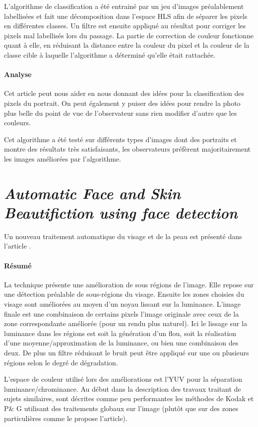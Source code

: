 \documentclass[11pt, french]{report-rd-info}
\begin{document}
L'algorithme de classification a été entrainé par un jeu d'images préalablement labellisées et fait une décomposition dans l'espace HLS afin de séparer les pixels en différentes classes. Un filtre est ensuite appliqué au résultat pour corriger les pixels mal labellisés lors du passage.
La partie de correction de couleur fonctionne quant à elle, en réduisant la distance entre la couleur du pixel et la couleur de la classe cible à laquelle l'algorithme a déterminé qu'elle était rattachée.

\paragraph{Analyse}
Cet article peut nous aider en nous donnant des idées pour la classification des pixels du portrait.
On peut également y puiser des idées pour rendre la photo plus belle du point de vue de l'observateur sans rien modifier d'autre que les couleurs.

Cet algorithme a été testé sur différents types d'images dont des portraits et montre des résultats très satisfaisants, les observateurs préfèrent majoritairement les images améliorées par l'algorithme.

\section{\emph{Automatic Face and Skin Beautifiction using face detection}}
Un nouveau traitement automatique du visage et de la peau est présenté dans l’article \cite{Ciuc2010}.

\paragraph{Résumé}
La technique présente une amélioration de sous régions de l’image.  Elle repose sur une détection préalable de sous-régions du visage. Ensuite les zones choisies du visage sont améliorées au moyen d'un noyau lissant sur la luminance. L'image finale est une combinaison de certains pixels l'image originale avec ceux de la zone correspondante améliorée (pour un rendu plus naturel).
Ici le lissage sur la luminance dans les régions est soit la génération d’un flou, soit la réalisation d’une moyenne/approximation de la luminance, ou bien une combinaison des deux. De plus un filtre réduisant le bruit peut être appliqué sur une ou plusieurs régions selon le degré de dégradation.

L’espace de couleur utilisé lors des améliorations est l’YUV pour la séparation luminance/chrominance.
Au début dans la description des travaux traitant de sujets similaires, sont décrites comme peu performantes les méthodes de Kodak et P\& G utilisant des traitements globaux sur l'image (plutôt que sur des zones particulières comme le propose l’article).
\end{document}
